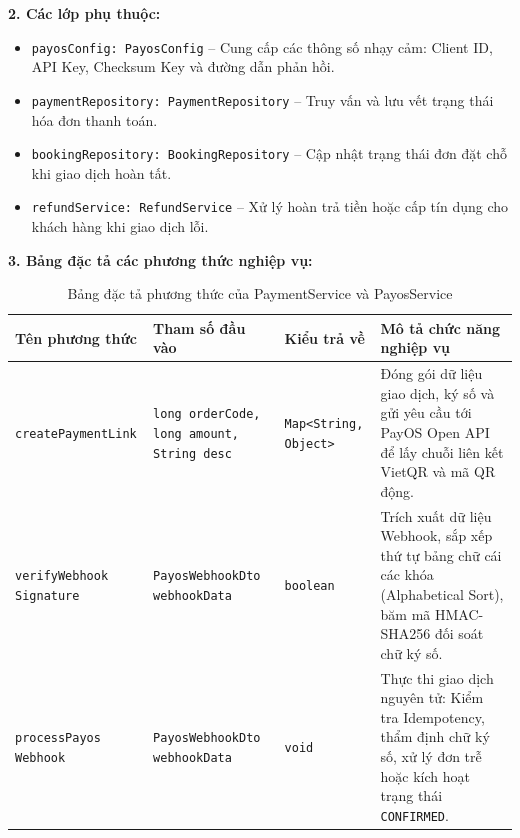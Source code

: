 \noindent\textbf{2. Các lớp phụ thuộc:}
\begin{itemize}
    \item \texttt{payosConfig: PayosConfig} -- Cung cấp các thông số nhạy cảm: Client ID, API Key, Checksum Key và đường dẫn phản hồi.
    \item \texttt{paymentRepository: PaymentRepository} -- Truy vấn và lưu vết trạng thái hóa đơn thanh toán.
    \item \texttt{bookingRepository: BookingRepository} -- Cập nhật trạng thái đơn đặt chỗ khi giao dịch hoàn tất.
    \item \texttt{refundService: RefundService} -- Xử lý hoàn trả tiền hoặc cấp tín dụng cho khách hàng khi giao dịch lỗi.
\end{itemize}

\noindent\textbf{3. Bảng đặc tả các phương thức nghiệp vụ:}

\begin{table}[H]
\centering
\caption{Bảng đặc tả phương thức của PaymentService và PayosService}
\label{tab:spec-payment-service}
\renewcommand{\arraystretch}{1.3}
\begin{tabular}{|p{3.8cm}|p{3.5cm}|p{2.2cm}|p{5.5cm}|}
\hline
\textbf{Tên phương thức} & \textbf{Tham số đầu vào} & \textbf{Kiểu trả về} & \textbf{Mô tả chức năng nghiệp vụ} \\
\hline
\texttt{createPaymentLink} & \texttt{long orderCode, long amount, String desc} & \texttt{Map<String, Object>} & Đóng gói dữ liệu giao dịch, ký số và gửi yêu cầu tới PayOS Open API để lấy chuỗi liên kết VietQR và mã QR động. \\
\hline
\texttt{verifyWebhook Signature} & \texttt{PayosWebhookDto webhookData} & \texttt{boolean} & Trích xuất dữ liệu Webhook, sắp xếp thứ tự bảng chữ cái các khóa (Alphabetical Sort), băm mã HMAC-SHA256 đối soát chữ ký số. \\
\hline
\texttt{processPayos Webhook} & \texttt{PayosWebhookDto webhookData} & \texttt{void} & Thực thi giao dịch nguyên tử: Kiểm tra Idempotency, thẩm định chữ ký số, xử lý đơn trễ hoặc kích hoạt trạng thái \texttt{CONFIRMED}. \\
\hline
\end{tabular}
\end{table}

